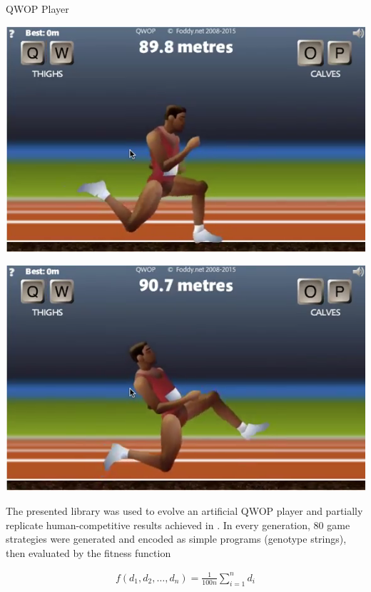 \documentclass[a0paper,portrait]{baposter}
\begin{document}
\begin{poster}
\begin{posterbox}[name=qwop,column=2]{QWOP Player}
	\parbox[c]{0.49\linewidth}{\includegraphics[width=\linewidth]{runner1}}
	\hfill
	\parbox[c]{0.49\linewidth}{\includegraphics[width=\linewidth]{runner2}}

	\vspace{0.5em}

	The presented library was used to evolve an artificial QWOP player and partially replicate human-competitive results achieved in \cite{EvolvingQwopGaits}. In every generation, 80 game strategies were generated and encoded as simple programs (genotype strings), then evaluated by the fitness function

	\vspace{-1.7em}

	\begin{align*}
		f(d_1,d_2,\dots,d_n) = \frac{1}{100n} \sum_{i=1}^n d_i
	\end{align*}

	\vspace{-0.5em}


\end{posterbox}
\end{poster}
\end{document}
